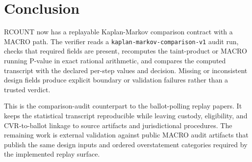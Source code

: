 \section{Conclusion}

RCOUNT now has a replayable Kaplan-Markov comparison contract with a MACRO path.
The verifier reads a \texttt{kaplan-markov-comparison-v1} audit run, checks that
required fields are present, recomputes the taint-product or MACRO running
P-value in exact rational arithmetic, and compares the computed transcript with
the declared per-step values and decision. Missing or inconsistent design fields
produce explicit boundary or validation failures rather than a trusted verdict.

This is the comparison-audit counterpart to the ballot-polling replay papers. It
keeps the statistical transcript reproducible while leaving custody, eligibility,
and CVR-to-ballot linkage to source artifacts and jurisdictional procedures. The
remaining work is external validation against public MACRO audit artifacts that
publish the same design inputs and ordered overstatement categories required by
the implemented replay surface.
